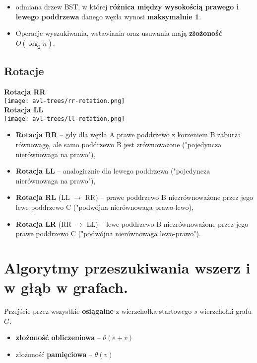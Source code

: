 \documentclass[main.tex]{subfiles}
\begin{document}
    \begin{itemize}
        \item odmiana drzew BST, w której \textbf{różnica między wysokością prawego i lewego poddrzewa} danego węzła
        wynosi \textbf{maksymalnie 1}.
        \item Operacje wyszukiwania, wstawiania oraz usuwania mają \textbf{złożoność} $O(\log_{2} n)$.
    \end{itemize}

    \subsection{Rotacje}
    \begin{multicols}{2}
        \textbf{Rotacja RR} \\

        \texttt{[image: avl-trees/rr-rotation.png]}
        \columnbreak \\
        \textbf{Rotacja LL} \\

        \texttt{[image: avl-trees/ll-rotation.png]}
    \end{multicols}

    \begin{itemize}
        \item \textbf{Rotacja RR} -- gdy dla węzła A prawe poddrzewo z korzeniem B zaburza równowagę, ale samo
        poddrzewo B jest zrównoważone ("pojedyncza nierównowaga na prawo"),
        \item \textbf{Rotacja LL} -- analogicznie dla lewego poddrzewa ("pojedyncza nierównowaga na prawo"),
        \item  \textbf{Rotacja RL} (LL $\rightarrow$ RR) -- prawe poddrzewo B niezrównoważone przez jego
        lewe poddrzewo C ("podwójna nierównowaga prawo-lewo),
        \item \textbf{Rotacja LR} (RR $\rightarrow$ LL) -- lewe poddrzewo B niezrównoważone przez jego prawe
        poddrzewo C ("podwójna nierównowaga lewo-prawo").
    \end{itemize}


    \section{Algorytmy przeszukiwania wszerz i w głąb w grafach.}

    Przejście przez wszystkie \textbf{osiągalne} z wierzchołka startowego $s$ wierzchołki grafu $G$.
    \begin{itemize}[noitemsep]
        \item \textbf{złożoność obliczeniowa} -- $\theta(e + v)$
        \item złożoność \textbf{pamięciowa} --  $\theta(v)$
    \end{itemize}
\end{document}
